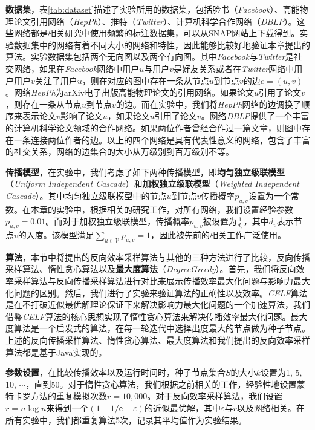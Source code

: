 \textbf{数据集}，表\ref{tab:dataset}描述了实验所用的数据集，包括脸书（\textit{Facebook}）、高能物理论文引用网络（\textit{HepPh}）、推特（\textit{Twitter}）、计算机科学合作网络（\textit{DBLP}）。这些网络都是相关研究中使用频繁的标注数据集，可以从SNAP网站上下载得到。实验数据集中的网络有着不同大小的网络和特性，因此能够比较好地验证本章提出的算法。实验数据集包括两个无向图以及两个有向图。其中\textit{Facebook}与\textit{Twitter}是社交网络，如果在\textit{Facebook}网络中用户$u$与用户$v$是好友关系或者在\textit{Twitter}网络中用户用户$v$关注了用户$u$，则在对应的图中存在一条从节点$u$到节点$v$的边$e=(u,v)$。网络\textit{HepPh}为arXiv电子出版高能物理论文的引用网络。如果论文$u$引用了论文$v$，则存在一条从节点$u$到节点$v$的边。而在实验中，我们将\textit{HepPh}网络的边调换了顺序来表示论文$v$影响了论文$u$，如果论文$u$引用了论文$v$。网络\textit{DBLP}提供了一个丰富的计算机科学论文领域的合作网络。如果两位作者曾经合作过一篇文章，则图中存在一条连接两位作者的边。以上的四个网络是具有代表性意义的网络，包含了丰富的社交关系，网络的边集合的大小从万级别到百万级别不等。

\textbf{传播模型}，在实验中，我们考虑了如下两种传播模型，即\textbf{均匀独立级联模型}（\textit{Uniform Independent Cascade}）和\textbf{加权独立级联模型}（\textit{Weighted Independent Cascade}）。其中均匀独立级联模型中的节点$u$到节点$v$传播概率$p_{u,v}$设置为一个常数。在本章的实验中，根据相关的研究工作，对所有网络，我们设置经验参数$p_{u,v}=0.01$。而对于加权独立级联模型，传播概率$p_{u,v}$被设置为$\frac{1}{d_v}$，其中$d_v$表示节点$v$的入度。该模型满足$\sum_{u \in \mathcal{V}}{p_{u,v}} = 1$，因此被先前的相关工作广泛使用。

\textbf{算法}，本节中将提出的反向效率采样算法与其他的三种方法进行了比较，反向传播采样算法、惰性贪心算法以及\textbf{最大度算法}（\textit{DegreeGreedy}）。首先，我们将反向效率采样算法与反向传播采样算法进行对比来展示传播效率最大化问题与影响力最大化问题的区别。然后，我们进行了实验来验证算法的正确性以及效率。\textit{CELF}算法是在不打破近似最优解理论保证下来解决影响力最大化问题的一个加速算法，我们借鉴\textit{CELF}算法的核心思想实现了惰性贪心算法来解决传播效率最大化问题。最大度算法是一个启发式的算法，在每一轮迭代中选择出度最大的节点做为种子节点。上述的反向传播采样算法、惰性贪心算法、最大度算法和我们提出的反向效率采样算法都是基于Java实现的。

\textbf{参数设置}，在比较传播效率以及运行时间时，种子节点集合$S$的大小$k$设置为1, 5, 10,
$\cdots$，直到50。对于惰性贪心算法，我们根据之前相关的工作，经验性地设置蒙特卡罗方法的重复模拟次数$r=10,000$。对于反向效率采样算法，我们设置$r=n\log{n}$来得到一个$(1-1/\mathsf{e}-\varepsilon)$的近似最优解，其中$\varepsilon$与$r$以及网络相关。在所有实验中，我们都重复算法5次，记录其平均值作为实验结果。

